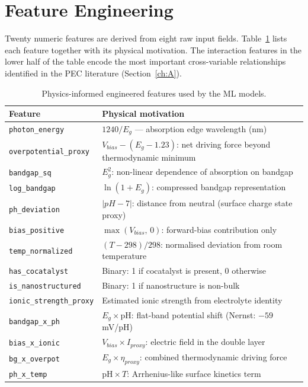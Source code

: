 \section{Feature Engineering}

Twenty numeric features are derived from eight raw input fields.
Table~\ref{tab:features} lists each feature together with its physical
motivation.
The interaction features in the lower half of the table encode the most
important cross-variable relationships identified in the PEC literature
(Section~\ref{ch:A}).

\begin{table}[htb]
\centering
\caption{Physics-informed engineered features used by the ML models.}
\label{tab:features}
\begin{tabular}{lp{8cm}}
\toprule
Feature & Physical motivation \\
\midrule
\texttt{photon\_energy}       & $1240/E_g$ --- absorption edge wavelength (nm) \\
\texttt{overpotential\_proxy} & $V_{bias} - (E_g - 1.23)$: net driving force beyond thermodynamic minimum \\
\texttt{bandgap\_sq}          & $E_g^2$: non-linear dependence of absorption on bandgap \\
\texttt{log\_bandgap}         & $\ln(1+E_g)$: compressed bandgap representation \\
\texttt{ph\_deviation}        & $|pH - 7|$: distance from neutral (surface charge state proxy) \\
\texttt{bias\_positive}       & $\max(V_{bias},\,0)$: forward-bias contribution only \\
\texttt{temp\_normalized}     & $(T - 298)/298$: normalised deviation from room temperature \\
\texttt{has\_cocatalyst}      & Binary: 1 if cocatalyst is present, 0 otherwise \\
\texttt{is\_nanostructured}   & Binary: 1 if nanostructure is non-bulk \\
\texttt{ionic\_strength\_proxy} & Estimated ionic strength from electrolyte identity \\
\texttt{bandgap\_x\_ph}       & $E_g \times \mathrm{pH}$: flat-band potential shift (Nernst: $-59$\,mV/pH) \\
\texttt{bias\_x\_ionic}       & $V_{bias} \times I_{proxy}$: electric field in the double layer \\
\texttt{bg\_x\_overpot}       & $E_g \times \eta_{proxy}$: combined thermodynamic driving force \\
\texttt{ph\_x\_temp}          & $\mathrm{pH} \times T$: Arrhenius-like surface kinetics term \\
\bottomrule
\end{tabular}
\end{table}

